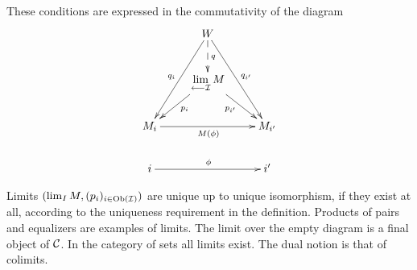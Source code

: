 
\begin{frame}
\noindent These conditions are expressed in the commutativity of the diagram
\begin{displaymath}
\xymatrix{
&\ar[ldd]_{q_i} W \ar@{-->}[d]^{q} \ar[rdd]^{q_{i'}} & \\
& \ar[ld]^{p_i} \lim\limits_{\longleftarrow \mathcal{I}} M \ar[rd]_{p_{i'}} &\\
M_i  \ar[rr]_{M(\phi)} & & M_{i'} \\
i \ar[rr]^{\phi} & & i'  
}
\end{displaymath}
\end{frame}

\begin{frame}
\noindent
Limits $(\mathop{\rm lim}\nolimits_I M, (p_i)_{i\in \mathop{\rm Ob}\nolimits(\mathcal{I})})$ are unique up to unique isomorphism, if they exist at all, according to the uniqueness requirement in the definition. Products of pairs and equalizers are examples of limits. The limit over the empty diagram is a final object of ${\mathcal C}$. In the category of sets all limits exist. The dual notion is that of colimits.
\end{frame}

